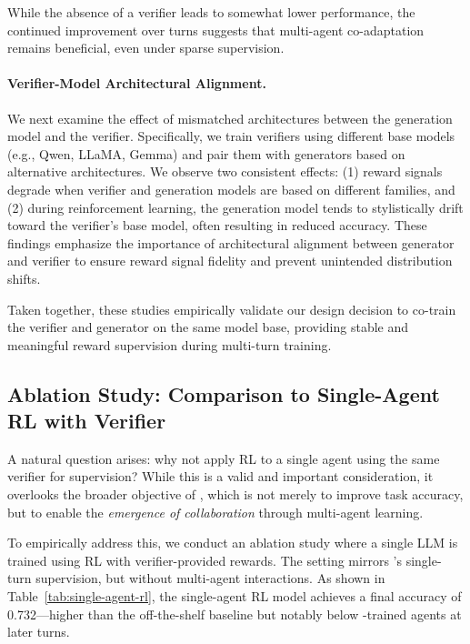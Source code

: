 While the absence of a verifier leads to somewhat lower performance, the continued improvement over turns suggests that multi-agent co-adaptation remains beneficial, even under sparse supervision.

\paragraph{Verifier-Model Architectural Alignment.}
We next examine the effect of mismatched architectures between the generation model and the verifier. Specifically, we train verifiers using different base models (e.g., Qwen, LLaMA, Gemma) and pair them with generators based on alternative architectures. We observe two consistent effects: (1) reward signals degrade when verifier and generation models are based on different families, and (2) during reinforcement learning, the generation model tends to stylistically drift toward the verifier’s base model, often resulting in reduced accuracy. These findings emphasize the importance of architectural alignment between generator and verifier to ensure reward signal fidelity and prevent unintended distribution shifts.

Taken together, these studies empirically validate our design decision to co-train the verifier and generator on the same model base, providing stable and meaningful reward supervision during multi-turn training.

\subsection{Ablation Study: Comparison to Single-Agent RL with Verifier}
\label{sec:single-agent-comparison}

A natural question arises: why not apply RL to a single agent using the same verifier for supervision? While this is a valid and important consideration, it overlooks the broader objective of \ours, which is not merely to improve task accuracy, but to enable the \textit{emergence of collaboration} through multi-agent learning.

To empirically address this, we conduct an ablation study where a single LLM is trained using RL with verifier-provided rewards. The setting mirrors \ours's single-turn supervision, but without multi-agent interactions. As shown in Table~\ref{tab:single-agent-rl}, the single-agent RL model achieves a final accuracy of 0.732—higher than the off-the-shelf baseline but notably below \ours-trained agents at later turns.

